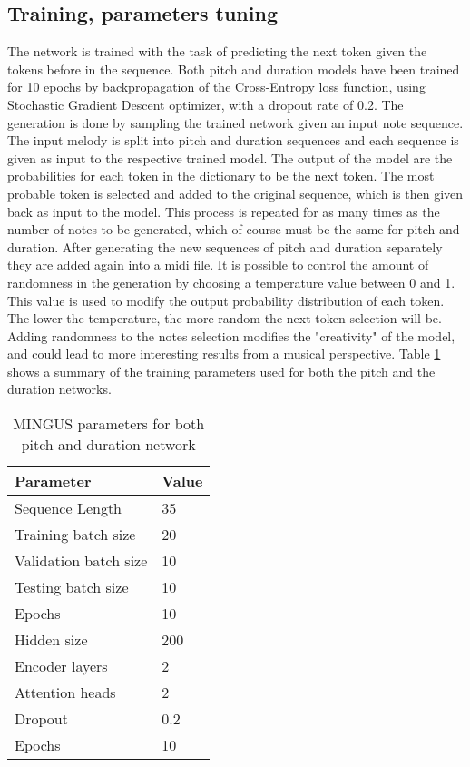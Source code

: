 \documentclass{article}
\begin{document}
\subsection{Training, parameters tuning}
The network is trained with the task of predicting the next token given the tokens before in the sequence. Both pitch and duration models have been trained for 10 epochs by backpropagation of the Cross-Entropy loss function, using Stochastic Gradient Descent optimizer, with a dropout rate of 0.2. 
The generation is done by sampling the trained network given an input note sequence. The input melody is split into pitch and duration sequences and each sequence is given as input to the respective trained model. The output of the model are the probabilities for each token in the dictionary to be the next token. The most probable token is selected and added to the original sequence, which is then given back as input to the model. This process is repeated for as many times as the number of notes to be generated, which of course must be the same for pitch and duration. After generating the new sequences of pitch and duration separately they are added again into a midi file. 
It is possible to control the amount of randomness in the generation by choosing a temperature value between 0 and 1. This value is used to modify the output probability distribution of each token. The lower the temperature, the more random the next token selection will be. Adding randomness to the notes selection modifies the "creativity" of the model, and could lead to more interesting results from a musical perspective. Table \ref{tab:params} shows a summary of the training parameters used for both the pitch and the duration networks.

\begin{table}[htbp]
	\caption{MINGUS parameters for both pitch and duration network}
	\begin{center}
		\begin{tabular}{ p{5cm} p{2cm} }
             \hline
             \textbf{Parameter} &  
             \textbf{Value} \\
             \hline
             \hline
             Sequence Length & 35 \\
             Training batch size & 20 \\
             Validation batch size & 10 \\
             Testing batch size & 10 \\
             Epochs & 10 \\
             Hidden size & 200 \\
             Encoder layers & 2 \\
             Attention heads & 2 \\
             Dropout & 0.2 \\
             Epochs & 10 \\
             \hline
    \end{tabular}
	\label{tab:params}
	\end{center}
\end{table}
\end{document}
